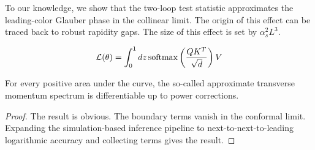 To our knowledge, we show that the two-loop test statistic approximates
the leading-color Glauber phase in the collinear limit. The origin of
this effect can be traced back to robust rapidity gaps. The size of this
effect is set by $\alpha_s^2 L^3$.

\begin{equation}
  \mathcal{L}(\theta) = \int_0^1 dz \, \mathrm{softmax}\left(\frac{Q K^T}{\sqrt{d}}\right) V
  \label{eq:5}
\end{equation}

\begin{lemma}\label{thm:1}
For every positive area under the curve, the so-called approximate
transverse momentum spectrum is differentiable up to power corrections.
\end{lemma}

\begin{proof}
The result is obvious. The boundary terms vanish in the conformal limit.
Expanding the simulation-based inference pipeline to
next-to-next-to-leading logarithmic accuracy and collecting terms gives
the result.
\end{proof}

